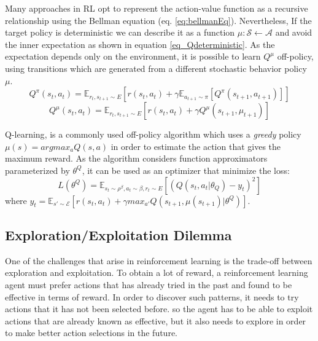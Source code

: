 Many approaches in RL opt to represent the action-value function as a recursive relationship using the Bellman equation (eq. \ref{eq:bellmanEq}). Nevertheless, If the target policy is deterministic we can describe it as a function $\mu: \mathcal{S} \leftarrow \mathcal{A}$ and avoid the inner expectation as shown in equation \ref{eq_Qdeterministic}. As the expectation depends only on the environment, it is possible to learn $Q^{\mu}$ off-policy, using transitions which are generated from a different stochastic behavior policy $\mu$.
\begin{equation}
\label{eq:bellmanEq}
Q^{\pi}(s_t, a_t) = \mathbb{E}_{r_{t}, s_{t+1} \sim E} [r(s_t, a_t) + \gamma \mathbb{E}_{a_{t+1} \sim \pi} [Q^{\pi}(s_{t+1}, a_{t+1})] ]
\end{equation}
\begin{equation}
\label{eq_Qdeterministic}
Q^{\mu}(s_t, a_t) = \mathbb{E}_{r_{t}, s_{t+1} \sim E} [r(s_t, a_t) + \gamma Q^{\mu}(s_{t+1}, \mu_{t+1}) ]
\end{equation}

Q-learning\cite{watkins1992q}, is a commonly used off-policy algorithm which uses a \textit{greedy} policy $\mu(s) = argmax_aQ(s, a)$ in order to estimate the action that gives the maximum reward. As the algorithm considers function approximators parameterized by $\theta^Q$, it can be used as an optimizer that minimize the loss:
\begin{equation}
\label{}
L(\theta^Q) = \mathbb{E}_{s_{t} \sim \rho^{\beta}, a_t \sim \beta, r_t \sim E} [(Q(s_t, a_t | \theta_Q) - y_t)^2]
\end{equation}
where $y_t = \mathbb{E}_{s'\sim \mathcal{E}} [r(s_t, a_t) + \gamma max_{a'} Q(s_{t+1}, \mu(s_{t+1}) | \theta^Q)]$. %

\subsection{Exploration/Exploitation Dilemma}

One of the challenges that arise in reinforcement learning is the trade-off between exploration and exploitation\cite{kaelbling1996reinforcement}\cite{sutton1998reinforcement}. To obtain a lot of reward, a reinforcement learning agent must prefer actions that has already tried in the past and found to be effective in terms of reward. In order to discover such patterns, it needs to try actions that it has not been selected before. so the agent has to be able to exploit actions that are already known as effective, but it also needs to explore in order to make better action selections in the future.


